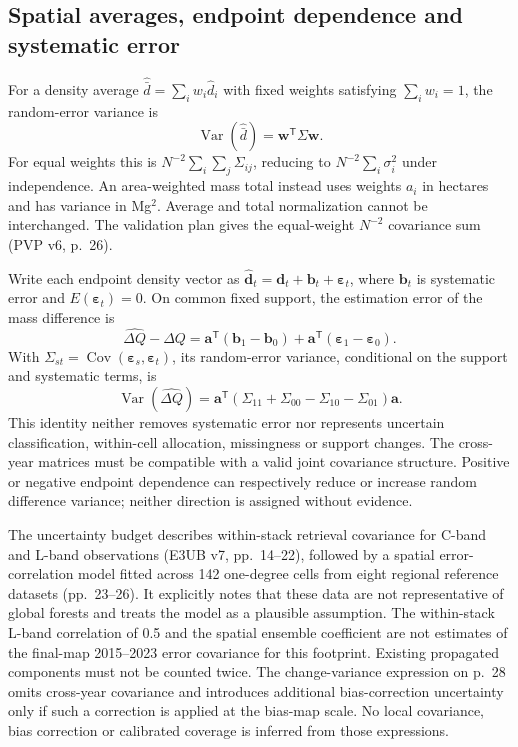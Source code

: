 \documentclass[11pt,a4paper]{article}
\begin{document}
\subsection{Spatial averages, endpoint dependence and systematic error}
For a density average $\widehat{\bar d}=\sum_i w_i\widehat d_i$ with fixed weights satisfying $\sum_i w_i=1$, the random-error variance is
\begin{equation}
\operatorname{Var}(\widehat{\bar d})=\boldsymbol w^{\mathsf T}\Sigma\boldsymbol w.
\end{equation}
For equal weights this is $N^{-2}\sum_i\sum_j\Sigma_{ij}$, reducing to $N^{-2}\sum_i\sigma_i^2$ under independence. An area-weighted mass total instead uses weights $a_i$ in hectares and has variance in Mg$^2$. Average and total normalization cannot be interchanged. The validation plan gives the equal-weight $N^{-2}$ covariance sum (PVP v6, p.~26).

Write each endpoint density vector as $\widehat{\boldsymbol d}_t=\boldsymbol d_t+\boldsymbol b_t+\boldsymbol\varepsilon_t$, where $\boldsymbol b_t$ is systematic error and $E(\boldsymbol\varepsilon_t)=0$. On common fixed support, the estimation error of the mass difference is
\begin{equation}
\widehat{\Delta Q}-\Delta Q=\boldsymbol a^{\mathsf T}(\boldsymbol b_1-\boldsymbol b_0)+\boldsymbol a^{\mathsf T}(\boldsymbol\varepsilon_1-\boldsymbol\varepsilon_0).
\end{equation}
With $\Sigma_{st}=\operatorname{Cov}(\boldsymbol\varepsilon_s,\boldsymbol\varepsilon_t)$, its random-error variance, conditional on the support and systematic terms, is
\begin{equation}
\operatorname{Var}(\widehat{\Delta Q})=\boldsymbol a^{\mathsf T}(\Sigma_{11}+\Sigma_{00}-\Sigma_{10}-\Sigma_{01})\boldsymbol a.
\end{equation}
This identity neither removes systematic error nor represents uncertain classification, within-cell allocation, missingness or support changes. The cross-year matrices must be compatible with a valid joint covariance structure. Positive or negative endpoint dependence can respectively reduce or increase random difference variance; neither direction is assigned without evidence.

The uncertainty budget describes within-stack retrieval covariance for C-band and L-band observations (E3UB v7, pp.~14--22), followed by a spatial error-correlation model fitted across 142 one-degree cells from eight regional reference datasets (pp.~23--26). It explicitly notes that these data are not representative of global forests and treats the model as a plausible assumption. The within-stack L-band correlation of 0.5 and the spatial ensemble coefficient are not estimates of the final-map 2015--2023 error covariance for this footprint. Existing propagated components must not be counted twice. The change-variance expression on p.~28 omits cross-year covariance and introduces additional bias-correction uncertainty only if such a correction is applied at the bias-map scale. No local covariance, bias correction or calibrated coverage is inferred from those expressions.
\end{document}
